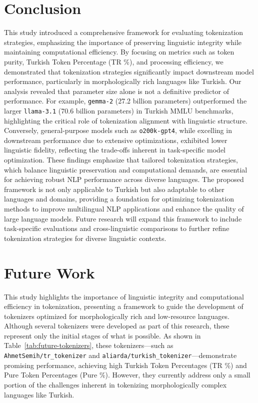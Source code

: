 \documentclass{article}
\begin{document}
  
  \section{Conclusion}

  This study introduced a comprehensive framework for evaluating tokenization strategies, emphasizing the importance of preserving linguistic integrity while maintaining computational efficiency. By focusing on metrics such as token purity, Turkish Token Percentage (TR \%), and processing efficiency, we demonstrated that tokenization strategies significantly impact downstream model performance, particularly in morphologically rich languages like Turkish. Our analysis revealed that parameter size alone is not a definitive predictor of performance. For example, \texttt{gemma-2} (27.2 billion parameters) outperformed the larger \texttt{llama-3.1} (70.6 billion parameters) in Turkish MMLU benchmarks, highlighting the critical role of tokenization alignment with linguistic structure. Conversely, general-purpose models such as \texttt{o200k-gpt4}, while excelling in downstream performance due to extensive optimizations, exhibited lower linguistic fidelity, reflecting the trade-offs inherent in task-specific model optimization. These findings emphasize that tailored tokenization strategies, which balance linguistic preservation and computational demands, are essential for achieving robust NLP performance across diverse languages. The proposed framework is not only applicable to Turkish but also adaptable to other languages and domains, providing a foundation for optimizing tokenization methods to improve multilingual NLP applications and enhance the quality of large language models. Future research will expand this framework to include task-specific evaluations and cross-linguistic comparisons to further refine tokenization strategies for diverse linguistic contexts.
  
  \section{Future Work}

  This study highlights the importance of linguistic integrity and computational efficiency in tokenization, presenting a framework to guide the development of tokenizers optimized for morphologically rich and low-resource languages. Although several tokenizers were developed as part of this research, these represent only the initial stages of what is possible. As shown in Table~\ref{tab:future-tokenizers}, these tokenizers—such as \texttt{AhmetSemih/tr\_tokenizer} and \texttt{aliarda/turkish\_tokenizer}—demonstrate promising performance, achieving high Turkish Token Percentages (TR \%) and Pure Token Percentages (Pure \%). However, they currently address only a small portion of the challenges inherent in tokenizing morphologically complex languages like Turkish.
  
\end{document}
